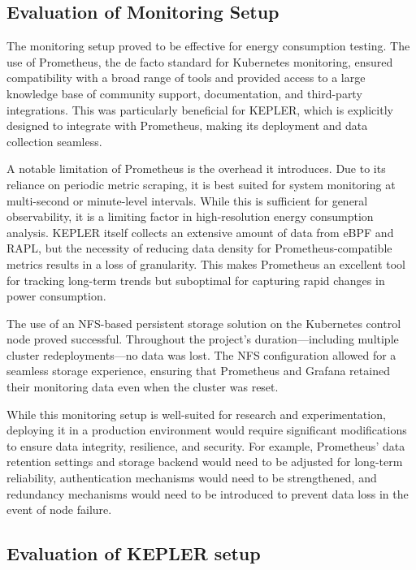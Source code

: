 \subsection{Evaluation of Monitoring Setup}

The monitoring setup proved to be effective for energy consumption testing. The use of Prometheus, the de facto standard for Kubernetes monitoring, ensured compatibility with a broad range of tools and provided access to a large knowledge base of community support, documentation, and third-party integrations. This was particularly beneficial for KEPLER, which is explicitly designed to integrate with Prometheus, making its deployment and data collection seamless.

A notable limitation of Prometheus is the overhead it introduces. Due to its reliance on periodic metric scraping, it is best suited for system monitoring at multi-second or minute-level intervals. While this is sufficient for general observability, it is a limiting factor in high-resolution energy consumption analysis. KEPLER itself collects an extensive amount of data from eBPF and RAPL, but the necessity of reducing data density for Prometheus-compatible metrics results in a loss of granularity. This makes Prometheus an excellent tool for tracking long-term trends but suboptimal for capturing rapid changes in power consumption.

The use of an NFS-based persistent storage solution on the Kubernetes control node proved successful. Throughout the project's duration—including multiple cluster redeployments—no data was lost. The NFS configuration allowed for a seamless storage experience, ensuring that Prometheus and Grafana retained their monitoring data even when the cluster was reset.

While this monitoring setup is well-suited for research and experimentation, deploying it in a production environment would require significant modifications to ensure data integrity, resilience, and security. For example, Prometheus' data retention settings and storage backend would need to be adjusted for long-term reliability, authentication mechanisms would need to be strengthened, and redundancy mechanisms would need to be introduced to prevent data loss in the event of node failure.

\subsection{Evaluation of KEPLER setup}

